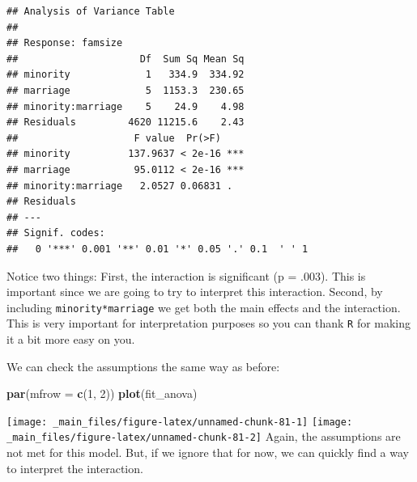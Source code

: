 \documentclass[]{tufte-book}
\newenvironment{Shaded}{}{}
\newcommand{\KeywordTok}[1]{\textcolor[rgb]{0.00,0.44,0.13}{\textbf{#1}}}
\newcommand{\DataTypeTok}[1]{\textcolor[rgb]{0.56,0.13,0.00}{#1}}
\newcommand{\DecValTok}[1]{\textcolor[rgb]{0.25,0.63,0.44}{#1}}
\newcommand{\StringTok}[1]{\textcolor[rgb]{0.25,0.44,0.63}{#1}}
\newcommand{\OperatorTok}[1]{\textcolor[rgb]{0.40,0.40,0.40}{#1}}
\newcommand{\NormalTok}[1]{#1}
\theoremstyle{definition}
\theoremstyle{definition}
\theoremstyle{remark}
\begin{document}
\begin{Shaded}
\end{Shaded}

\begin{verbatim}
## Analysis of Variance Table
## 
## Response: famsize
##                     Df  Sum Sq Mean Sq
## minority             1   334.9  334.92
## marriage             5  1153.3  230.65
## minority:marriage    5    24.9    4.98
## Residuals         4620 11215.6    2.43
##                    F value  Pr(>F)    
## minority          137.9637 < 2e-16 ***
## marriage           95.0112 < 2e-16 ***
## minority:marriage   2.0527 0.06831 .  
## Residuals                             
## ---
## Signif. codes:  
##   0 '***' 0.001 '**' 0.01 '*' 0.05 '.' 0.1  ' ' 1
\end{verbatim}

Notice two things: First, the interaction is significant (p = .003).
This is important since we are going to try to interpret this
interaction. Second, by including \texttt{minority*marriage} we get both
the main effects and the interaction. This is very important for
interpretation purposes so you can thank \texttt{R} for making it a bit
more easy on you.

We can check the assumptions the same way as before:

\begin{Shaded}
\begin{Highlighting}[]
\KeywordTok{par}\NormalTok{(}\DataTypeTok{mfrow =} \KeywordTok{c}\NormalTok{(}\DecValTok{1}\NormalTok{, }\DecValTok{2}\NormalTok{))}
\KeywordTok{plot}\NormalTok{(fit_anova)}
\end{Highlighting}
\end{Shaded}

\texttt{[image: \_main\_files/figure-latex/unnamed-chunk-81-1]}
\texttt{[image: \_main\_files/figure-latex/unnamed-chunk-81-2]} Again, the
assumptions are not met for this model. But, if we ignore that for now,
we can quickly find a way to interpret the interaction.
\end{document}
